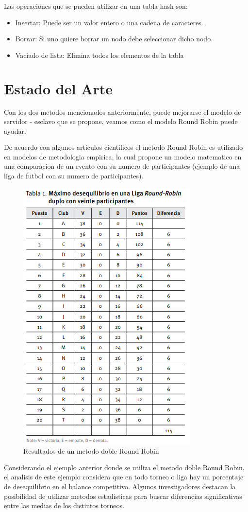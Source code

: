 \documentclass[conference,letterpaper]{IEEEtran}
\begin{document}
Las operaciones que se pueden utilizar en una tabla hash son:
\begin{itemize}
    \item Insertar: Puede ser un valor entero o una cadena de caracteres.
    \item Borrar: Si uno quiere borrar un nodo debe seleccionar dicho nodo.
    \item Vaciado de lista: Elimina todos los elementos de la tabla
\end{itemize}

\section{Estado del Arte}
Con los dos metodos mencionados anteriormente, puede mejorarse el modelo de servidor - esclavo que se propone, veamos como el modelo Round Robin puede ayudar.

De acuerdo con algunos articulos cientificos el metodo Round Robin es utilizado en modelos de metodologia empirica, la cual propone un modelo matematico en una comparacion de un evento con su numero de participantes (ejemplo de una liga de futbol con su numero de participantes).

\begin{figure}[thpb]
    \centering
    \includegraphics[width=0.55\linewidth]{tabla.png}
    \caption{Resultados de un metodo doble Round Robin}
    \label{fig:tabla}
\end{figure}

Considerando el ejemplo anterior donde se utiliza el metodo doble Round Robin, el analisis de este ejemplo considera que en todo torneo o liga hay un porcentaje de desequilibrio en el balance competitivo. Algunos investigadores destacan la posibilidad de utilizar metodos estadisticas para buscar diferencias significativas entre las medias de los distintos torneos.
\end{document}

